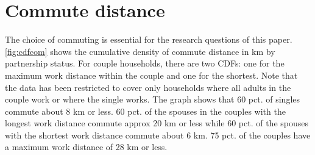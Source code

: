





\section{Commute distance}
The choice of commuting is essential for the research questions of this paper. \autoref{fig:cdfcom} shows the cumulative density of commute distance in km by partnership status. For couple households, there are two CDFs: one for the maximum work distance within the couple and one for the shortest. Note that the data has been restricted to cover only households where all adults in the couple work or where the single works. The graph shows that 60 pct. of singles commute about 8 km or less. 60 pct. of the spouses in the couples with the longest work distance commute approx 20 km or less while 60 pct. of the spouses with the shortest work distance commute about 6 km. 75 pct. of the couples have a maximum work distance of 28 km or less. 


